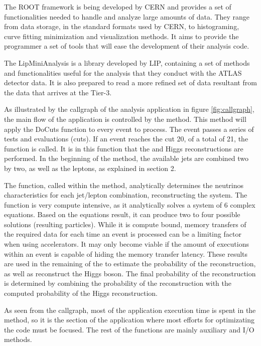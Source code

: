 The ROOT framework is being developed by CERN and provides a set of functionalities needed to handle and analyze large amounts of data. They range from data storage, in the standard formats used by CERN, to histograming, curve fitting minimization and visualization methods. It aims to provide the programmer a set of tools that will ease the development of their analysis code.

The LipMiniAnalysis is a library developed by LIP, containing a set of methods and functionalities useful for the analysis that they conduct with the ATLAS detector data. It is also prepared to read a more refined set of data resultant from the data that arrives at the Tier-3.

As illustrated by the callgraph of the analysis application in figure \ref{fig:callgraph}, the main flow of the application is controlled by the \ttLoop method. This method will apply the DoCuts function to every event to process. The event passes a series of tests and evaluations (cuts). If an event reaches the cut 20, of a total of 21, the \ttDilepKinFit function is called. It is in this function that the \ttbar and Higgs reconstructions are performed. In the beginning of the \ttDilepKinFit method, the available jets are combined two by two, as well as the leptons, as explained in section 2.

The \dilep function, called within the \ttDilepKinFit method, analytically determines the neutrinos characteristics for each jet/lepton combination, reconstructing the \ttbar system. The function is very compute intensive, as it analytically solves a system of 6 complex equations. Based on the equations result, it can produce two to four possible solutions (resulting particles). While it is compute bound, memory transfers of the required data for each time an event is processed can be a limiting factor when using accelerators. It may only become viable if the amount of \dilep executions within an event is capable of hiding the memory transfer latency. These results are used in the remaining of the \ttDilepKinFit to estimate the probability of the reconstruction, as well as reconstruct the Higgs boson. The final probability of the reconstruction is determined by combining the probability of the \ttbar reconstruction with the computed probability of the Higgs reconstruction.

As seen from the callgraph, most of the application execution time is spent in the \ttDilepKinFit method, so it is the section of the application where most efforts for optimizating the code must be focused. The rest of the functions are mainly auxiliary and I/O methods.

\newpage
